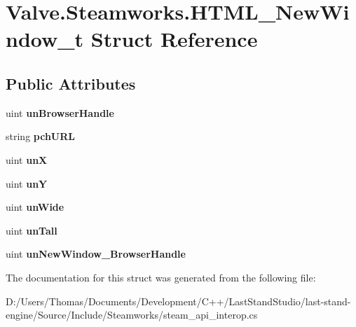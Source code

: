 \hypertarget{structValve_1_1Steamworks_1_1HTML__NewWindow__t}{}\section{Valve.\+Steamworks.\+H\+T\+M\+L\+\_\+\+New\+Window\+\_\+t Struct Reference}
\label{structValve_1_1Steamworks_1_1HTML__NewWindow__t}
\subsection*{Public Attributes}
\begin{DoxyCompactItemize}
\item 
\hypertarget{structValve_1_1Steamworks_1_1HTML__NewWindow__t_a5cec08adefeb5eb917061592d124db55}{}uint {\bfseries un\+Browser\+Handle}\label{structValve_1_1Steamworks_1_1HTML__NewWindow__t_a5cec08adefeb5eb917061592d124db55}

\item 
\hypertarget{structValve_1_1Steamworks_1_1HTML__NewWindow__t_a672c8e518499ce693720664532d90574}{}string {\bfseries pch\+U\+R\+L}\label{structValve_1_1Steamworks_1_1HTML__NewWindow__t_a672c8e518499ce693720664532d90574}

\item 
\hypertarget{structValve_1_1Steamworks_1_1HTML__NewWindow__t_aeb2f99792387c6b626ebbf334b3dbc0f}{}uint {\bfseries un\+X}\label{structValve_1_1Steamworks_1_1HTML__NewWindow__t_aeb2f99792387c6b626ebbf334b3dbc0f}

\item 
\hypertarget{structValve_1_1Steamworks_1_1HTML__NewWindow__t_ac1b24c6d23060a33da93388cf4d4ad38}{}uint {\bfseries un\+Y}\label{structValve_1_1Steamworks_1_1HTML__NewWindow__t_ac1b24c6d23060a33da93388cf4d4ad38}

\item 
\hypertarget{structValve_1_1Steamworks_1_1HTML__NewWindow__t_a064f386b030f1ae24e3a1e5fdc4dfe75}{}uint {\bfseries un\+Wide}\label{structValve_1_1Steamworks_1_1HTML__NewWindow__t_a064f386b030f1ae24e3a1e5fdc4dfe75}

\item 
\hypertarget{structValve_1_1Steamworks_1_1HTML__NewWindow__t_aa53735b02c3c619fd578d6db98036429}{}uint {\bfseries un\+Tall}\label{structValve_1_1Steamworks_1_1HTML__NewWindow__t_aa53735b02c3c619fd578d6db98036429}

\item 
\hypertarget{structValve_1_1Steamworks_1_1HTML__NewWindow__t_a4b1791462fd48e1d06c1c1f6e6f1f510}{}uint {\bfseries un\+New\+Window\+\_\+\+Browser\+Handle}\label{structValve_1_1Steamworks_1_1HTML__NewWindow__t_a4b1791462fd48e1d06c1c1f6e6f1f510}

\end{DoxyCompactItemize}


The documentation for this struct was generated from the following file\+:\begin{DoxyCompactItemize}
\item 
D\+:/\+Users/\+Thomas/\+Documents/\+Development/\+C++/\+Last\+Stand\+Studio/last-\/stand-\/engine/\+Source/\+Include/\+Steamworks/steam\+\_\+api\+\_\+interop.\+cs\end{DoxyCompactItemize}
